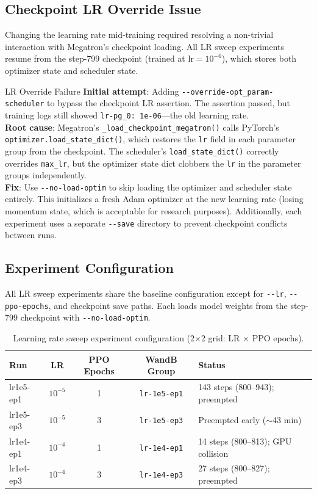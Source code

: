 \documentclass[11pt,a4paper]{article}
\begin{document}
\subsection{Checkpoint LR Override Issue}

Changing the learning rate mid-training required resolving a non-trivial
interaction with Megatron's checkpoint loading. All LR sweep experiments resume
from the step-799 checkpoint (trained at $\mathrm{lr} = 10^{-6}$), which stores
both optimizer state and scheduler state.

\begin{bugbox}{LR Override Failure}
\textbf{Initial attempt}: Adding \texttt{-{}-override-opt\_param-scheduler} to
bypass the checkpoint LR assertion. The assertion passed, but training logs
still showed \texttt{lr-pg\_0: 1e-06}---the old learning rate.\\[0.3em]
\textbf{Root cause}: Megatron's \texttt{\_load\_checkpoint\_megatron()} calls
PyTorch's \texttt{optimizer.load\_state\_dict()}, which restores the \texttt{lr}
field in each parameter group from the checkpoint. The scheduler's
\texttt{load\_state\_dict()} correctly overrides \texttt{max\_lr}, but the
optimizer state dict clobbers the \texttt{lr} in the parameter groups
independently.\\[0.3em]
\textbf{Fix}: Use \texttt{-{}-no-load-optim} to skip loading the optimizer and
scheduler state entirely. This initializes a fresh Adam optimizer at the new
learning rate (losing momentum state, which is acceptable for research purposes).
Additionally, each experiment uses a separate \texttt{-{}-save} directory to
prevent checkpoint conflicts between runs.
\end{bugbox}

\subsection{Experiment Configuration}

All LR sweep experiments share the baseline configuration except for
\texttt{-{}-lr}, \texttt{-{}-ppo-epochs}, and checkpoint save paths. Each loads
model weights from the step-799 checkpoint with \texttt{-{}-no-load-optim}.

\begin{table}[H]
\centering
\caption{Learning rate sweep experiment configuration (2$\times$2 grid: LR $\times$ PPO epochs).}
\label{tab:lr_sweep_config}
\begin{tabular}{@{}lcccl@{}}
\toprule
\textbf{Run} & \textbf{LR} & \textbf{PPO Epochs} & \textbf{WandB Group} & \textbf{Status} \\
\midrule
lr1e5-ep1 & $10^{-5}$ & 1 & \texttt{lr-1e5-ep1} & 143 steps (800--943); preempted \\
lr1e5-ep3 & $10^{-5}$ & 3 & \texttt{lr-1e5-ep3} & Preempted early ($\sim$43 min) \\
lr1e4-ep1 & $10^{-4}$ & 1 & \texttt{lr-1e4-ep1} & 14 steps (800--813); GPU collision \\
lr1e4-ep3 & $10^{-4}$ & 3 & \texttt{lr-1e4-ep3} & 27 steps (800--827); preempted \\
\bottomrule
\end{tabular}
\end{table}
\end{document}
